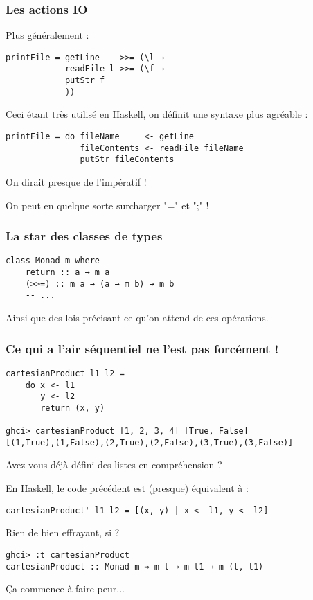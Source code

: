 \documentclass[10pt]{beamer}
\begin{document}
\begin{frame}[fragile]
\frametitle{Les actions IO}
Plus généralement :
\begin{verbatim}
printFile = getLine    >>= (\l →
            readFile l >>= (\f →
            putStr f
            ))
\end{verbatim}

Ceci étant très utilisé en Haskell, on définit une syntaxe plus agréable :

\begin{verbatim}
printFile = do fileName     <- getLine
               fileContents <- readFile fileName
               putStr fileContents
\end{verbatim}

On dirait presque de l'impératif !

On peut en quelque sorte surcharger "=" et ";" !
\end{frame}



\begin{frame}[fragile]
\frametitle{La star des classes de types}
\begin{verbatim}
class Monad m where
    return :: a → m a
    (>>=) :: m a → (a → m b) → m b
    -- ...
\end{verbatim}

Ainsi que des lois précisant ce qu'on attend de ces opérations.
\end{frame}



\begin{frame}[fragile]
\frametitle{Ce qui a l'air séquentiel ne l'est pas forcément !}
\begin{verbatim}
cartesianProduct l1 l2 =
    do x <- l1
       y <- l2
       return (x, y)

ghci> cartesianProduct [1, 2, 3, 4] [True, False]
[(1,True),(1,False),(2,True),(2,False),(3,True),(3,False)]
\end{verbatim}

Avez-vous déjà défini des listes en compréhension ?

\pause

En Haskell, le code précédent est (presque) équivalent à :

\begin{verbatim}
cartesianProduct' l1 l2 = [(x, y) | x <- l1, y <- l2]
\end{verbatim}

Rien de bien effrayant, si ?

\pause

\begin{verbatim}
ghci> :t cartesianProduct
cartesianProduct :: Monad m ⇒ m t → m t1 → m (t, t1)
\end{verbatim}

Ça commence à faire peur...

\end{frame}
\end{document}
